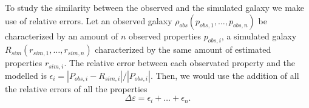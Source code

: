 \documentclass[usenatbib]{mn2e}
\begin{document}
To study the similarity between the observed and the simulated galaxy we make use of relative errors. Let an observed galaxy $\rho_{obs}(p_{obs,1}, \dots ,p_{obs,n})$ 
be characterized by an amount of $n$ observed properties $p_{obs,i}$, a simulated galaxy $R_{sim}(r_{sim,1}, \dots,r_{sim,n})$ characterized by the same amount
 of  estimated properties $r_{sim,i}$. The relative error between each observated property and the modelled is $\epsilon_i=|P_{obs,i}-R_{sim,i}|/|P_{obs,i}|$. Then,
we would use the addition of all the relative errors of all the properties
\begin{equation}
 \Delta \varepsilon = \epsilon_i+\dots+\epsilon_n.\label{eq:relative_error}
\end{equation}
                                                                                                                                                                                                                                                                                                                                                                                                                                                                                                                                                                                             
\end{document}
